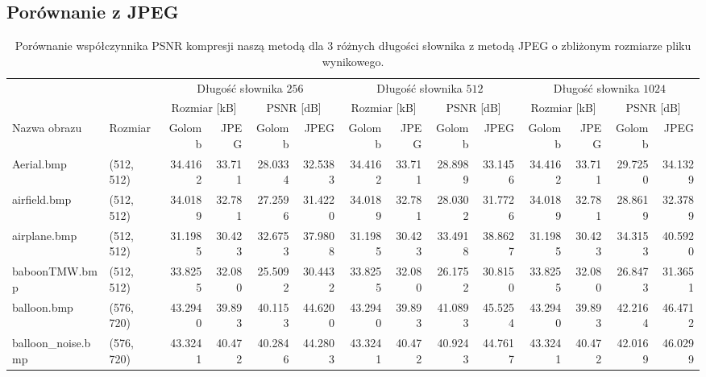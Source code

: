 \documentclass{article}
\begin{document}
\subsection{Porównanie z JPEG}

\begin{table}[H]
  \caption{Porównanie współczynnika PSNR kompresji naszą metodą dla 3 różnych długości słownika z metodą JPEG o zbliżonym rozmiarze pliku wynikowego.}
  \label{tab:jpg}
\begin{adjustbox}{center}
\tiny
\begin{tabular}{llrrrrrrrrrrrr}
\toprule
    {} & {} & \multicolumn{4}{c}{Długość słownika $256$} & \multicolumn{4}{c}{Długość słownika $512$} & \multicolumn{4}{c}{Długość słownika $1024$} \\
    \cmidrule(lr){3-6}
    \cmidrule(lr){7-10}
    \cmidrule(lr){11-14}
    {} & {} & \multicolumn{2}{c}{Rozmiar [kB]} & \multicolumn{2}{c}{PSNR [dB]} & \multicolumn{2}{c}{Rozmiar [kB]} & \multicolumn{2}{c}{PSNR [dB]} & \multicolumn{2}{c}{Rozmiar [kB]} & \multicolumn{2}{c}{PSNR [dB]}  \\ 
    \cmidrule(lr){3-4}
    \cmidrule(lr){5-6}
    \cmidrule(lr){7-8}
    \cmidrule(lr){9-10}
    \cmidrule(lr){11-12}
    \cmidrule(lr){13-14}
    Nazwa obrazu &  Rozmiar &  Golomb &  JPEG &  Golomb  &  JPEG &  Golomb &  JPEG &  Golomb &  JPEG & Golomb &  JPEG &  Golomb &  JPEG \\
\midrule
     Aerial.bmp &  (512, 512) &   34.4162 &    33.711 &   28.0334 &   32.5383 &   34.4162 &    33.711 &   28.8989 &   33.1456 &   34.4162 &    33.711 &   29.7250 &   34.1329 \\
      airfield.bmp &  (512, 512) &   34.0189 &    32.781 &   27.2596 &   31.4220 &   34.0189 &    32.781 &   28.0302 &   31.7726 &   34.0189 &    32.781 &   28.8619 &   32.3789 \\
      airplane.bmp &  (512, 512) &   31.1985 &    30.423 &   32.6753 &   37.9808 &   31.1985 &    30.423 &   33.4918 &   38.8627 &   31.1985 &    30.423 &   34.3153 &   40.5920 \\
     baboonTMW.bmp &  (512, 512) &   33.8255 &    32.080 &   25.5092 &   30.4432 &   33.8255 &    32.080 &   26.1752 &   30.8150 &   33.8255 &    32.080 &   26.8473 &   31.3651 \\
       balloon.bmp &  (576, 720) &   43.2940 &    39.893 &   40.1153 &   44.6200 &   43.2940 &    39.893 &   41.0893 &   45.5254 &   43.2940 &    39.893 &   42.2164 &   46.4712 \\
 balloon\_noise.bmp &  (576, 720) &   43.3241 &    40.472 &   40.2846 &   44.2803 &   43.3241 &    40.472 &   40.9243 &   44.7617 &   43.3241 &    40.472 &   42.0169 &   46.0299 \\

\end{tabular}
\end{adjustbox}
\end{table}
\end{document}
